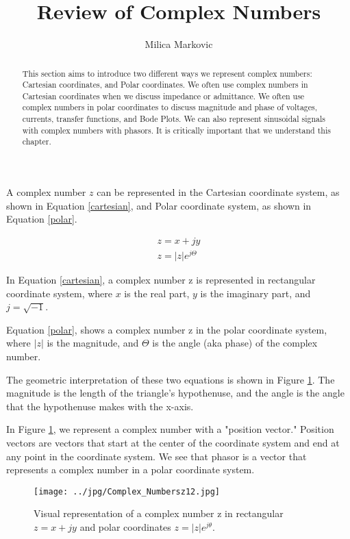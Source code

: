 \documentclass{ximera}
\title{Review of Complex Numbers}
\author{Milica Markovic}
\begin{document}
  
\begin{abstract}  
This section aims to introduce two different ways we represent complex numbers: Cartesian coordinates, and Polar coordinates. We often use complex numbers in Cartesian coordinates when we discuss impedance or admittance. We often use complex numbers in polar coordinates to discuss magnitude and phase of voltages, currents, transfer functions, and Bode Plots. We can also represent sinusoidal signals with complex numbers with phasors. It is critically important that we understand this chapter.
\end{abstract}  
\maketitle    
  
\begin{definition}
 A complex number  $z$ can be represented in the Cartesian coordinate system, as shown in Equation \ref{cartesian}, and  Polar coordinate system, as shown in Equation \ref{polar}.




\begin{eqnarray}
z= x + j y \label{cartesian} \\ 
z=|z| e^{j \Theta} \label{polar}
\end{eqnarray}

\end{definition}

In Equation \ref{cartesian}, a complex number z is represented in rectangular coordinate system, where $x$ is the real part, $y$ is the imaginary part, and $j=\sqrt{-1}$. 

 Equation \ref{polar}, shows a complex number z  in the polar coordinate system, where  $|z|$ is the magnitude, and $\Theta$ is the angle (aka phase) of the complex number.

The geometric interpretation of these two equations is shown in Figure \ref{cartpol}. The magnitude is the length of the triangle's hypothenuse, and the angle is the angle that the hypothenuse makes with the x-axis. 

 In Figure \ref{cartpol}, we  represent a complex number with a "position vector." Position vectors are vectors that start at the center of the coordinate system and end at any point in the coordinate system. We see that phasor is a vector that represents a complex number in a polar coordinate system. 



\begin{figure}[htbp]
\begin{center}
\texttt{[image: ../jpg/Complex\_Numbersz12.jpg]}
\end{center}
\caption{Visual representation of a complex number z in rectangular $z=x+jy$ and polar coordinates $z=|z|e^{j \theta}$.}
\label{cartpol}
\end{figure}
\end{document}
